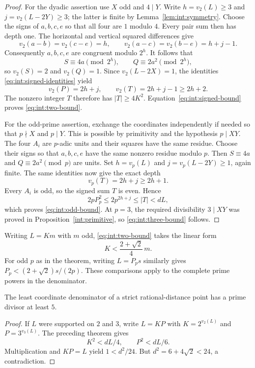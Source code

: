 \begin{proof}
For the dyadic assertion use $X$ odd and $4\mid Y$. Write
$h=v_2(L)\ge3$ and $j=v_2(L-2Y)\ge3$; the latter is finite by
Lemma~\ref{lem:int:symmetry}. Choose the signs of $a,b,c,e$ so that
all four are $1$ modulo $4$. Every pair sum then has depth one.
The horizontal and vertical squared differences give
\[
 v_2(a-b)=v_2(c-e)=h,\qquad
 v_2(a-c)=v_2(b-e)=h+j-1.
\]
Consequently $a,b,c,e$ are congruent modulo $2^h$. It follows that
\[
 S\equiv4a\pmod{2^h},\qquad
 Q\equiv2a^2\pmod{2^h},
\]
so $v_2(S)=2$ and $v_2(Q)=1$. Since $v_2(L-2X)=1$, the identities
\eqref{eq:int:signed-identities} yield
\[
 v_2(P)=2h+j,\qquad v_2(T)=2h+j-1\ge2h+2.
\]
The nonzero integer $T$ therefore has $|T|\ge4K^2$.
Equation~\eqref{eq:int:signed-bound} proves \eqref{eq:int:two-bound}.

For the odd-prime assertion, exchange the coordinates independently
if needed so that $p\nmid X$ and $p\mid Y$. This is possible by
primitivity and the hypothesis $p\mid XY$. The four $A_i$ are
$p$-adic units and their squares have the same residue. Choose their
signs so that $a,b,c,e$ have the same nonzero residue modulo $p$.
Then $S\equiv4a$ and $Q\equiv2a^2\pmod p$ are units.
Set $h=v_p(L)$ and $j=v_p(L-2Y)\ge1$, again finite. The same
identities now give the exact depth
\[
 v_p(T)=2h+j\ge2h+1.
\]
Every $A_i$ is odd, so the signed sum $T$ is even. Hence
\[
 2pP_p^2\le2p^{2h+j}\le |T|<dL,
\]
which proves \eqref{eq:int:odd-bound}. At $p=3$, the required
divisibility $3\mid XY$ was proved in
Proposition~\ref{int:primitive}, so \eqref{eq:int:three-bound}
follows.
\end{proof}

Writing $L=Km$ with $m$ odd, \eqref{eq:int:two-bound} takes the
linear form
\[
 K<\frac{2+\sqrt2}{4}\,m.
\]
For odd $p$ as in the theorem, writing $L=P_ps$ similarly gives
$P_p<(2+\sqrt2)s/(2p)$. These comparisons apply to the complete
prime powers in the denominator.

\begin{corollary}\label{cor:int:six-smooth}
The least coordinate denominator of a strict rational-distance point
has a prime divisor at least $5$.
\end{corollary}

\begin{proof}
If $L$ were supported on $2$ and $3$, write $L=KP$ with
$K=2^{v_2(L)}$ and $P=3^{v_3(L)}$. The preceding theorem gives
\[
 K^2<dL/4,\qquad P^2<dL/6.
\]
Multiplication and $KP=L$ yield $1<d^2/24$. But
$d^2=6+4\sqrt2<24$, a contradiction.
\end{proof}

